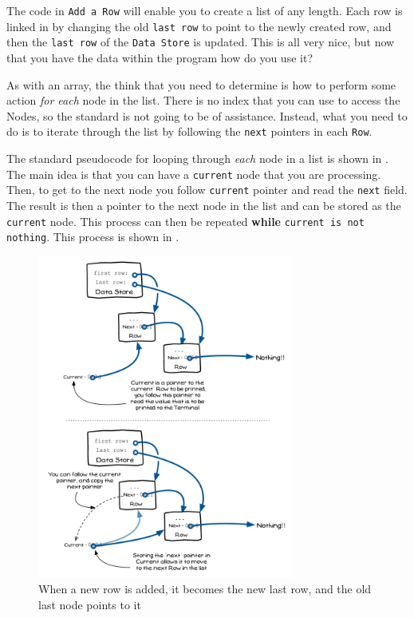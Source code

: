 The code in \texttt{Add a Row} will enable you to create a list of any length. Each row is linked in by changing the old \texttt{last row} to point to the newly created row, and then the \texttt{last row} of the \texttt{Data Store} is updated. This is all very nice, but now that you have the data within the program how do you use it?

As with an array, the think that you need to determine is how to perform some action \emph{for each} node in the list. There is no index that you can use to access the Nodes, so the standard  is not going to be of assistance. Instead, what you need to do is to iterate through the list by following the \texttt{next} pointers in each \texttt{Row}.

The standard pseudocode for looping through \emph{each} node in a list is shown in . The main idea is that you can have a \texttt{current} node that you are processing. Then, to get to the next node you follow \texttt{current} pointer and read the \texttt{next} field. The result is then a pointer to the next node in the list and can be stored as the \texttt{current} node. This process can then be repeated \textbf{while} \texttt{current is not nothing}. This process is shown in .

\begin{figure}[htbp]
   \centering
   \includegraphics[width=0.75\textwidth]{./topics/dynamic-memory/diagrams/IterateList} 
   \caption{When a new row is added, it becomes the new last row, and the old last node points to it}
   \label{fig:iterate-list}
\end{figure}

